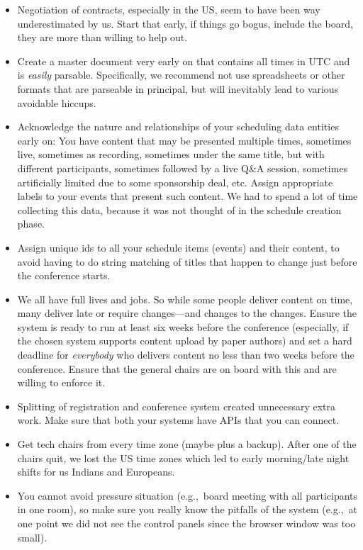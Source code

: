 \documentclass[%
10pt,								%
titlepage,						%
]
{scrartcl}
\begin{document}
\begin{itemize}
    \item Negotiation of contracts, especially in the US, seem to have been way underestimated by us. Start that early, if things go bogus, include the board, they are more than willing to help out.
    \item Create a master document very early on that contains all times in UTC and is \emph{easily} parsable. Specifically, we recommend not use spreadsheets or other formats that are parseable in principal, but will inevitably lead to various avoidable hiccups.
    \item Acknowledge the nature and relationships of your scheduling data entities early on: You have content that may be presented multiple times, sometimes live, sometimes as recording, sometimes under the same title, but with different participants, sometimes followed by a live Q\&A session, sometimes artificially limited due to some sponsorship deal, etc. Assign appropriate labels to your events that present such content. We had to spend a lot of time collecting this data, because it was not thought of in the schedule creation phase.
    \item Assign unique ids to all your schedule items (events) and their content, to avoid having to do string matching of titles that happen to change just before the conference starts.
    \item We all have full lives and jobs. So while some people deliver content on time, many deliver late or require changes---and changes to the changes. Ensure the system is ready to run at least six weeks before the conference (especially, if the chosen system supports content upload by paper authors) and set a hard deadline for \emph{everybody} who delivers content no less than two weeks before the conference. Ensure that the general chairs are on board with this and are willing to enforce it.
    \item Splitting of registration and conference system created unnecessary extra work. Make sure that both your systems have APIs that you can connect.
    \item Get tech chairs from every time zone (maybe plus a backup). After one of the chairs quit, we lost the US time zones which led to early morning/late night shifts for us Indians and Europeans.
    \item You cannot avoid pressure situation (e.g.,~board meeting with all participants in one room), so make sure you really know the pitfalls of the system (e.g.,~at one point we did not see the control panels since the browser window was too small).

\end{itemize}
\end{document}
